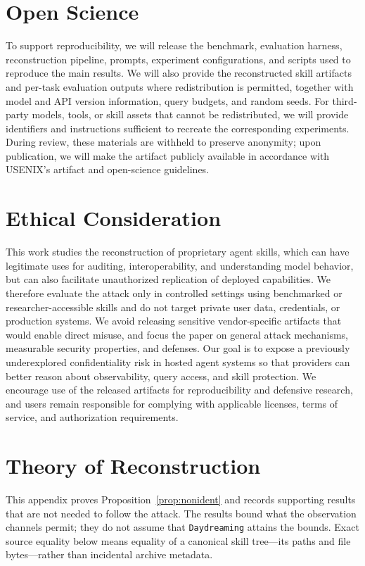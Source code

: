 \documentclass[letterpaper,twocolumn,10pt]{article}
\newcommand{\method}{\texttt{Daydreaming}\xspace}
\begin{document}
\section*{Open Science}
To support reproducibility, we will release the benchmark, evaluation harness, reconstruction pipeline, prompts, experiment configurations, and scripts used to reproduce the main results. We will also provide the reconstructed skill artifacts and per-task evaluation outputs where redistribution is permitted, together with model and API version information, query budgets, and random seeds. For third-party models, tools, or skill assets that cannot be redistributed, we will provide identifiers and instructions sufficient to recreate the corresponding experiments. During review, these materials are withheld to preserve anonymity; upon publication, we will make the artifact publicly available in accordance with USENIX's artifact and open-science guidelines.
\section*{Ethical Consideration}
This work studies the reconstruction of proprietary agent skills, which can have legitimate uses for auditing, interoperability, and understanding model behavior, but can also facilitate unauthorized replication of deployed capabilities. We therefore evaluate the attack only in controlled settings using benchmarked or researcher-accessible skills and do not target private user data, credentials, or production systems. We avoid releasing sensitive vendor-specific artifacts that would enable direct misuse, and focus the paper on general attack mechanisms, measurable security properties, and defenses. Our goal is to expose a previously underexplored confidentiality risk in hosted agent systems so that providers can better reason about observability, query access, and skill protection. We encourage use of the released artifacts for reproducibility and defensive research, and users remain responsible for complying with applicable licenses, terms of service, and authorization requirements.
\section{Theory of Reconstruction}
\label{app:limits}

This appendix proves Proposition~\ref{prop:nonident} and records supporting
results that are not needed to follow the attack.  The results bound what the
observation channels permit; they do not assume that \method attains the bounds.
Exact source equality below means equality of a canonical skill tree---its
paths and file bytes---rather than incidental archive metadata.
\end{document}
